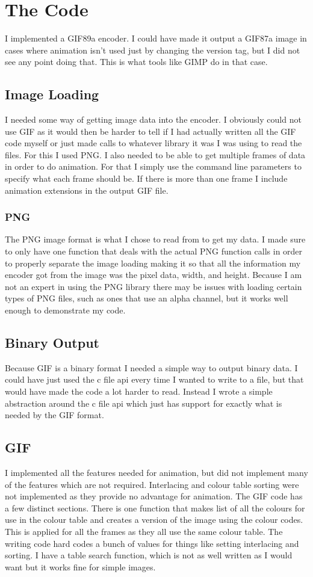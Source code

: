 \documentclass[11pt]{article} %
\begin{document}
\section{The Code}
I implemented a GIF89a encoder. I could have made it output a GIF87a image in cases where animation isn't used just by changing the version tag, but I did not see any point doing that. This is what tools like GIMP do in that case. 
\subsection{Image Loading}
I needed some way of getting image data into the encoder. I obviously could not use GIF as it would then be harder to tell if I had actually written all the GIF code myself or just made calls to whatever library it was I was using to read the files. For this I used PNG.
I also needed to be able to get multiple frames of data in order to do animation. For that I simply use the command line parameters to specify what each frame should be. If there is more than one frame I include animation extensions in the output GIF file.
\subsubsection{PNG}
The PNG image format is what I chose to read from to get my data. I made sure to only have one function that deals with the actual PNG function calls in order to properly separate the image loading making it so that all the information my encoder got from the image was the pixel data, width, and height. Because I am not an expert in using the PNG library there may be issues with loading certain types of PNG files, such as ones that use an alpha channel, but it works well enough to demonstrate my code.
\subsection{Binary Output}
Because GIF is a binary format I needed a simple way to output binary data. I could have just used the c file api every time I wanted to write to a file, but that would have made the code a lot harder to read. Instead I wrote a simple abstraction around the c file api which just has support for exactly what is needed by the GIF format.
\subsection{GIF}
I implemented all the features needed for animation, but did not implement many of the features which are not required. Interlacing and colour table sorting were not implemented as they provide no advantage for animation. The GIF code has a few distinct sections. There is one function that makes list of all the colours for use in the colour table and creates a version of the image using the colour codes. This is applied for all the frames as they all use the same colour table. The writing code hard codes a bunch of values for things like setting interlacing and sorting. I have a table search function, which is not as well written as I would want but it works fine for simple images.
\end{document}
